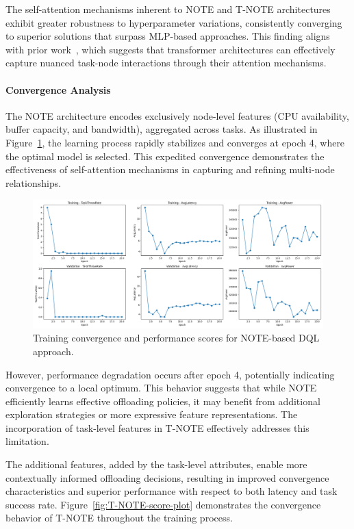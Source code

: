 \documentclass[preprint,3p,authoryear]{elsarticle}
\begin{document}
The self-attention mechanisms inherent to NOTE and T-NOTE architectures exhibit greater robustness to hyperparameter variations, consistently converging to superior solutions that surpass MLP-based approaches. This finding aligns with prior work~\cite{gholipour_tpto_2023}, which suggests that transformer architectures can effectively capture nuanced task-node interactions through their attention mechanisms.

\paragraph{Convergence Analysis}

The NOTE architecture encodes exclusively node-level features (CPU availability, buffer capacity, and bandwidth), aggregated across tasks. As illustrated in Figure~\ref{fig:NOTE-score-plot}, the learning process rapidly stabilizes and converges at epoch 4, where the optimal model is selected. This expedited convergence demonstrates the effectiveness of self-attention mechanisms in capturing and refining multi-node relationships.

\begin{figure}[H]
    \centering
    \includegraphics[width=1\linewidth]{figs/NOTE/score_plot.png}
    \caption{Training convergence and performance scores for NOTE-based DQL approach.}
    \label{fig:NOTE-score-plot}
\end{figure}

However, performance degradation occurs after epoch 4, potentially indicating convergence to a local optimum. This behavior suggests that while NOTE efficiently learns effective offloading policies, it may benefit from additional exploration strategies or more expressive feature representations. The incorporation of task-level features in T-NOTE effectively addresses this limitation.

The additional features, added by the task-level attributes, enable more contextually informed offloading decisions, resulting in improved convergence characteristics and superior performance with respect to both latency and task success rate. Figure~\ref{fig:T-NOTE-score-plot} demonstrates the convergence behavior of T-NOTE throughout the training process.
\end{document}
